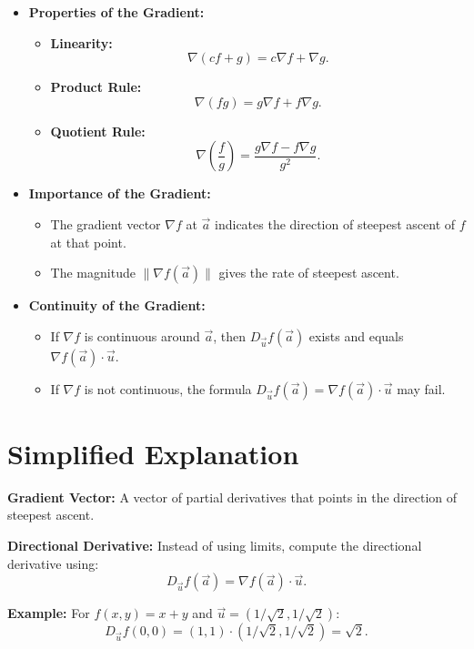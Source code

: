 \documentclass{article}
\begin{document}
\begin{itemize}
  \item \textbf{Properties of the Gradient:}
    \begin{itemize}
      \item \textbf{Linearity:}
        \[
          \nabla (cf + g) = c \nabla f + \nabla g.
        \]
      \item \textbf{Product Rule:}
        \[
          \nabla (fg) = g \nabla f + f \nabla g.
        \]
      \item \textbf{Quotient Rule:}
        \[
          \nabla \left(\frac{f}{g}\right) = \frac{g \nabla f - f \nabla g}{g^2}.
        \]
    \end{itemize}

  \item \textbf{Importance of the Gradient:}
    \begin{itemize}
      \item The gradient vector $\nabla f$ at $\vec{a}$ indicates the direction of steepest ascent of $f$ at that point.
      \item The magnitude $\|\nabla f(\vec{a})\|$ gives the rate of steepest ascent.
    \end{itemize}

  \item \textbf{Continuity of the Gradient:}
    \begin{itemize}
      \item If $\nabla f$ is continuous around $\vec{a}$, then $D_{\vec{u}} f(\vec{a})$ exists and equals $\nabla f(\vec{a}) \cdot \vec{u}$.
      \item If $\nabla f$ is not continuous, the formula $D_{\vec{u}} f(\vec{a}) = \nabla f(\vec{a}) \cdot \vec{u}$ may fail.
    \end{itemize}
\end{itemize}

\section*{Simplified Explanation}

\textbf{Gradient Vector:}
A vector of partial derivatives that points in the direction of steepest ascent.

\textbf{Directional Derivative:}
Instead of using limits, compute the directional derivative using:
\[
  D_{\vec{u}} f(\vec{a}) = \nabla f(\vec{a}) \cdot \vec{u}.
\]

\textbf{Example:}
For $f(x, y) = x + y$ and $\vec{u} = (1/\sqrt{2}, 1/\sqrt{2})$:
\[
  D_{\vec{u}} f(0, 0) = (1, 1) \cdot (1/\sqrt{2}, 1/\sqrt{2}) = \sqrt{2}.
\]
\end{document}
